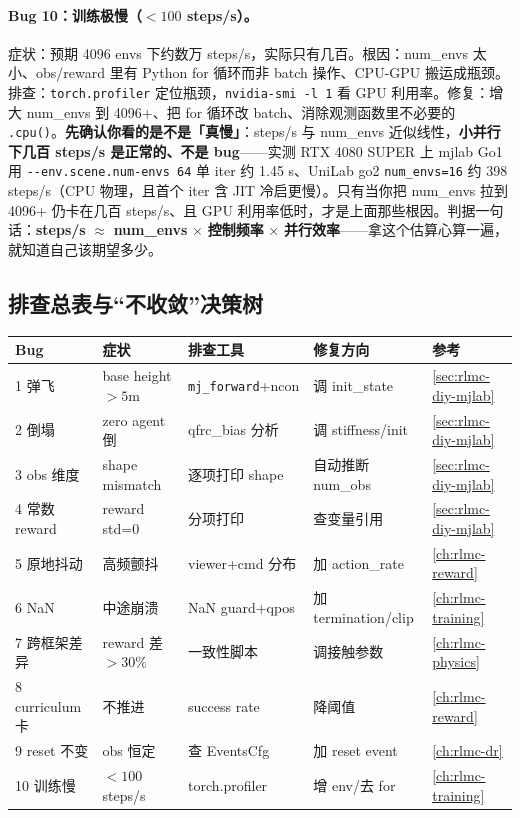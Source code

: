 \paragraph{Bug 10：训练极慢（$<100$ steps/s）。}症状：预期 4096 envs 下约数万 steps/s，实际只有几百。根因：num\_envs 太小、obs/reward 里有 Python for 循环而非 batch 操作、CPU-GPU 搬运成瓶颈。排查：\verb|torch.profiler| 定位瓶颈，\verb|nvidia-smi -l 1| 看 GPU 利用率。修复：增大 num\_envs 到 4096+、把 for 循环改 batch、消除观测函数里不必要的 \verb|.cpu()|。\textbf{先确认你看的是不是「真慢」}：steps/s 与 num\_envs 近似线性，\textbf{小并行下几百 steps/s 是正常的、不是 bug}——实测 RTX 4080 SUPER 上 mjlab Go1 用 \verb|--env.scene.num-envs 64| 单 iter 约 1.45 s、UniLab go2 \verb|num_envs=16| 约 398 steps/s（CPU 物理，且首个 iter 含 JIT 冷启更慢）。只有当你把 num\_envs 拉到 4096+ 仍卡在几百 steps/s、且 GPU 利用率低时，才是上面那些根因。判据一句话：\textbf{steps/s} $\approx$ \textbf{num\_envs} $\times$ \textbf{控制频率} $\times$ \textbf{并行效率}——拿这个估算心算一遍，就知道自己该期望多少。

\subsection{排查总表与“不收敛”决策树}
\label{sec:rlmc-diy-bugs-table}

\begin{center}
\small
\begin{tabular}{@{}lp{3.0cm}p{3.2cm}p{3.0cm}l@{}}
\toprule
Bug & 症状 & 排查工具 & 修复方向 & 参考 \\
\midrule
1 弹飞 & base height $>5$m & \verb|mj_forward|+ncon & 调 init\_state & \cref{sec:rlmc-diy-mjlab} \\
2 倒塌 & zero agent 倒 & qfrc\_bias 分析 & 调 stiffness/init & \cref{sec:rlmc-diy-mjlab} \\
3 obs 维度 & shape mismatch & 逐项打印 shape & 自动推断 num\_obs & \cref{sec:rlmc-diy-mjlab} \\
4 常数 reward & reward std=0 & 分项打印 & 查变量引用 & \cref{sec:rlmc-diy-mjlab} \\
5 原地抖动 & 高频颤抖 & viewer+cmd 分布 & 加 action\_rate & \cref{ch:rlmc-reward} \\
6 NaN & 中途崩溃 & NaN guard+qpos & 加 termination/clip & \cref{ch:rlmc-training} \\
7 跨框架差异 & reward 差 $>30\%$ & 一致性脚本 & 调接触参数 & \cref{ch:rlmc-physics} \\
8 curriculum 卡 & 不推进 & success rate & 降阈值 & \cref{ch:rlmc-reward} \\
9 reset 不变 & obs 恒定 & 查 EventsCfg & 加 reset event & \cref{ch:rlmc-dr} \\
10 训练慢 & $<100$ steps/s & torch.profiler & 增 env/去 for & \cref{ch:rlmc-training} \\
\bottomrule
\end{tabular}
\end{center}

